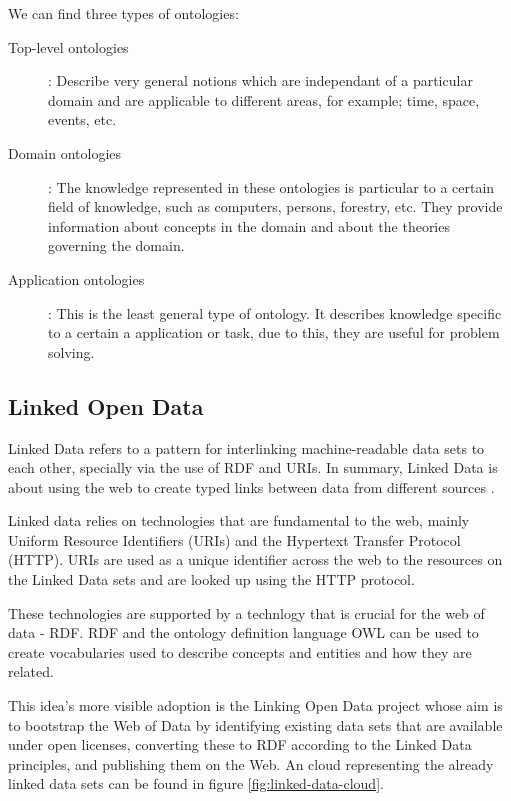 We can find three types of ontologies:

\begin{description}
	\item[Top-level ontologies]: Describe very general notions which are independant of a particular domain and are applicable to different areas, for example; time, space, events, etc.
	
	\item[Domain ontologies]: The knowledge represented in these ontologies is particular to a certain field of knowledge, such as computers, persons, forestry, etc.	They provide information about concepts in the domain and about the theories governing the domain.
	
	\item[Application ontologies]: This is the least general type of ontology. It describes knowledge specific to a certain a application or task, due to this, they are useful for problem solving.
\end{description}

\subsection{Linked Open Data}

Linked Data refers to a pattern for interlinking machine-readable data sets to each other, specially via the use of RDF and URIs. In summary, Linked Data is about using the web to create typed links between data from different sources \cite{linkeddata}.

Linked data relies on technologies that are fundamental to the web, mainly Uniform Resource Identifiers (URIs) and the Hypertext Transfer Protocol (HTTP). URIs are used as a unique identifier across the web to the resources on the Linked Data sets and are looked up using the HTTP protocol.

These technologies are supported by a technlogy that is crucial for the web of data - RDF. RDF and the ontology definition language OWL can be used to create vocabularies used to describe concepts and entities and how they are related.

This idea's more visible adoption is the Linking Open Data project \cite{linkingopendata} whose aim is to bootstrap the Web of Data by identifying existing data sets that are available under open licenses, converting these to RDF according to the Linked Data principles, and publishing them on the Web. An cloud representing the already linked data sets can be found in figure \ref{fig:linked-data-cloud}.

